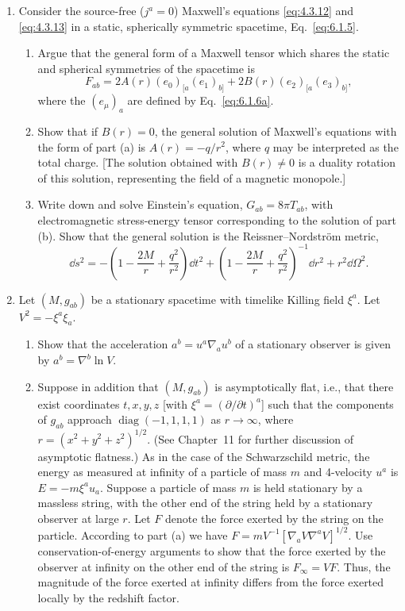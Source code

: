 \begin{enumerate}[label=\arabic*., leftmargin=*, itemsep=1.1em]
\item Consider the source-free (\(j^a=0\)) Maxwell's equations
  \eqref{eq:4.3.12} and \eqref{eq:4.3.13} in a static, spherically symmetric
  spacetime, Eq.~\eqref{eq:6.1.5}.
  \begin{enumerate}[label=\alph*), leftmargin=2.2em, itemsep=.45em]
  \item Argue that the general form of a Maxwell tensor which shares the static
    and spherical symmetries of the spacetime is
    \[
      F_{ab}=2A(r)(e_0)_{[a}(e_1)_{b]}
      +2B(r)(e_2)_{[a}(e_3)_{b]},
    \]
    where the \((e_\mu)_a\) are defined by Eq.~\eqref{eq:6.1.6a}.
  \item Show that if \(B(r)=0\), the general solution of Maxwell's equations with
    the form of part (a) is \(A(r)=-q/r^2\), where \(q\) may be interpreted as the
    total charge. [The solution obtained with \(B(r)\ne0\) is a duality rotation
    of this solution, representing the field of a magnetic monopole.]
  \item Write down and solve Einstein's equation, \(G_{ab}=8\pi T_{ab}\), with
    electromagnetic stress-energy tensor corresponding to the solution of part
    (b). Show that the general solution is the Reissner--Nordstr\"om metric,
    \[
      \dd s^2=-\left(1-\frac{2M}{r}+\frac{q^2}{r^2}\right)\dd t^2+
      \left(1-\frac{2M}{r}+\frac{q^2}{r^2}\right)^{-1}\dd r^2+r^2\dd\Omega^2.
    \]
  \end{enumerate}

\item Let \((M,g_{ab})\) be a stationary spacetime with timelike Killing field
  \(\xi^a\). Let \(V^2=-\xi^a\xi_a\).
  \begin{enumerate}[label=\alph*), leftmargin=2.2em, itemsep=.45em]
  \item Show that the acceleration
    \(a^b=u^a\nabla_a u^b\) of a stationary observer is given by
    \(a^b=\nabla^b\ln V\).
  \item Suppose in addition that \((M,g_{ab})\) is asymptotically flat, i.e., that
    there exist coordinates \(t,x,y,z\) [with \(\xi^a=(\partial/\partial t)^a\)]
    such that the components of \(g_{ab}\) approach
    \(\operatorname{diag}(-1,1,1,1)\) as \(r\to\infty\), where
    \(r=(x^2+y^2+z^2)^{1/2}\). (See Chapter~11 for further discussion of
    asymptotic flatness.) As in the case of the Schwarzschild metric, the energy
    as measured at infinity of a particle of mass \(m\) and 4-velocity \(u^a\)
    is \(E=-m\xi^au_a\). Suppose a particle of mass \(m\) is held stationary by a
    massless string, with the other end of the string held by a stationary observer
    at large \(r\). Let \(F\) denote the force exerted by the string on the
    particle. According to part (a) we have
    \(F=mV^{-1}[\nabla_aV\nabla^aV]^{1/2}\). Use conservation-of-energy
    arguments to show that the force exerted by the observer at infinity on the
    other end of the string is \(F_\infty=VF\). Thus, the magnitude of the force
    exerted at infinity differs from the force exerted locally by the redshift
    factor.
  \end{enumerate}


\end{enumerate}
